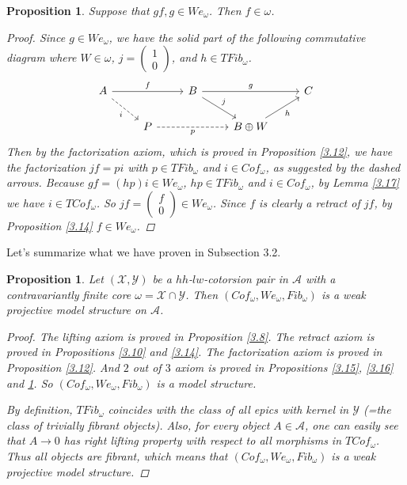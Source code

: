 \documentclass[12pt]{amsart}
\numberwithin{equation}{section}
\newtheorem{proposition}[lemma]{Proposition}
\theoremstyle{definition}
\newtheorem*{theorem 0*}{Theorem}
\newtheorem*{theorem a*}{Theorem A}
\newtheorem*{theorem b*}{Theorem B}
\newcounter{diagram}
\numberwithin{diagram}{section}
\begin{document}
\begin{proposition}\label{3.18}
Suppose that $gf, g\in We_{\omega}$. Then $f\in\omega$.
\begin{proof}
Since $g\in We_{\omega}$, we have the solid part of the following commutative diagram where $W\in\omega$,
$j=\begin{pmatrix}1\\ 0\end{pmatrix}$, and $h\in TFib_{\omega}$.
\[\begin{tikzcd}
	A && B && C \\
	& P && {B\oplus W}
	\arrow["f", from=1-1, to=1-3]
	\arrow["i"', dashed, from=1-1, to=2-2]
	\arrow["g", from=1-3, to=1-5]
	\arrow["j", from=1-3, to=2-4]
	\arrow["p"', dashed, from=2-2, to=2-4]
	\arrow["h"', from=2-4, to=1-5]
\end{tikzcd}\]
Then by the factorization axiom, which is proved in Proposition \ref{3.12}, we have the factorization $jf=pi$ with $p\in TFib_{\omega}$ and $i\in Cof_{\omega}$, as suggested by the dashed arrows.
Because $gf=(hp)i\in We_{\omega}$, $hp\in TFib_{\omega}$ and $i\in Cof_{\omega}$, by Lemma \ref{3.17} we have $i\in TCof_{\omega}$. So $jf=\begin{pmatrix}f\\0\end{pmatrix}\in We_{\omega}$. Since $f$ is clearly a retract of $jf$, by Proposition \ref{3.14} $f\in We_{\omega}$.
\end{proof}
\end{proposition}
Let's summarize what we have proven in Subsection 3.2.
\begin{proposition}\label{3.19}
    Let $(\mathcal{X},\mathcal{Y})$ be a $hh$-$lw$-cotorsion pair in $\mathcal{A}$ with a contravariantly finite core $\omega=\mathcal{X}\cap\mathcal{Y}$.
    Then $(Cof_{\omega},We_{\omega},Fib_{\omega})$ is a weak projective model structure on $\mathcal{A}$.
    \begin{proof}
    The lifting axiom is proved in Proposition \ref{3.8}. The retract axiom is proved in Propositions \ref{3.10} and \ref{3.14}.
    The factorization axiom is proved in Proposition \ref{3.12}. And $2$ out of $3$ axiom is proved in Propositions \ref{3.15}, \ref{3.16} and \ref{3.18}.
    So $(Cof_{\omega},We_{\omega},Fib_{\omega})$ is a model structure.

    By definition, $TFib_{\omega}$ coincides with the class of all epics with kernel in $\mathcal{Y}$ (=the class of trivially fibrant objects). Also, for every object $A\in\mathcal{A}$, one can easily see that $A\rightarrow 0$ has right lifting property with respect to all morphisms in $TCof_{\omega}$. Thus all objects are fibrant, which means that $(Cof_{\omega},We_{\omega},Fib_{\omega})$ is a weak projective model structure.
    \end{proof}
\end{proposition}
\end{document}
